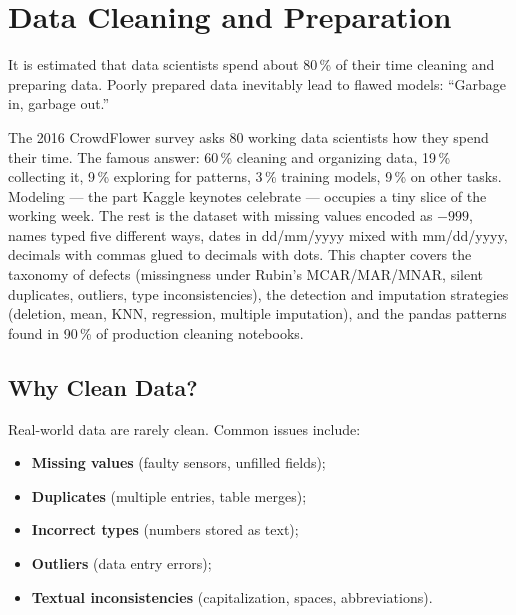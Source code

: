 \chapter{Data Cleaning and Preparation}
\label{ch:nettoyage}

\begin{intuition}
It is estimated that data scientists spend about 80\,\% of their time cleaning and preparing data. Poorly prepared data inevitably lead to flawed models: ``Garbage in, garbage out.''
\end{intuition}

The 2016 CrowdFlower survey asks 80 working data scientists how they spend their time. The famous answer: 60\,\% cleaning and organizing data, 19\,\% collecting it, 9\,\% exploring for patterns, 3\,\% training models, 9\,\% on other tasks. Modeling --- the part Kaggle keynotes celebrate --- occupies a tiny slice of the working week. The rest is the dataset with missing values encoded as $-999$, names typed five different ways, dates in dd/mm/yyyy mixed with mm/dd/yyyy, decimals with commas glued to decimals with dots. This chapter covers the taxonomy of defects (missingness under Rubin's MCAR/MAR/MNAR, silent duplicates, outliers, type inconsistencies), the detection and imputation strategies (deletion, mean, KNN, regression, multiple imputation), and the pandas patterns found in 90\,\% of production cleaning notebooks.

\section{Why Clean Data?}

Real-world data are rarely clean. Common issues include:
\begin{itemize}
    \item \textbf{Missing values} (faulty sensors, unfilled fields);
    \item \textbf{Duplicates} (multiple entries, table merges);
    \item \textbf{Incorrect types} (numbers stored as text);
    \item \textbf{Outliers} (data entry errors);
    \item \textbf{Textual inconsistencies} (capitalization, spaces, abbreviations).
\end{itemize}

